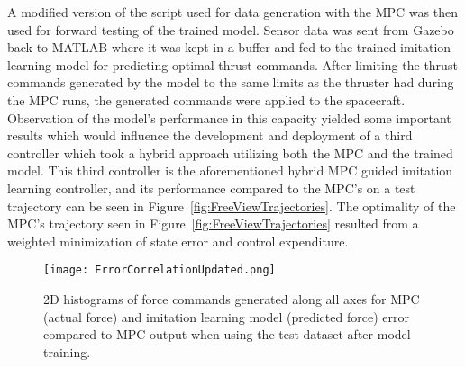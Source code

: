 \documentclass[twocolumn,letterpaper]{IEEEAerospaceCLS}
\begin{document}
A modified version of the script used for data generation with the MPC was then used for forward testing of the trained model. Sensor data was sent from Gazebo back to MATLAB where it was kept in a buffer and fed to the trained imitation learning model for predicting optimal thrust commands. After limiting the thrust commands generated by the model to the same limits as the thruster had during the MPC runs, the generated commands were applied to the spacecraft. Observation of the model's performance in this capacity yielded some important results which would influence the development and deployment of a third controller which took a hybrid approach utilizing both the MPC and the trained model\cite{Sinha2023-st,Hobbs2021-kh}. This third controller is the aforementioned hybrid MPC guided imitation learning controller, and its performance compared to the MPC's on a test trajectory can be seen in Figure~\ref{fig:FreeViewTrajectories}. The optimality of the MPC's trajectory seen in Figure~\ref{fig:FreeViewTrajectories} resulted from a weighted minimization of state error and control expenditure.

\begin{figure*}
\centering
\texttt{[image: ErrorCorrelationUpdated.png]}
\caption{2D histograms of force commands generated along all axes for MPC (actual force) and imitation learning model (predicted force) error compared to MPC output when using the test dataset after model training.}
\label{fig:FullFinalHist}
\end{figure*}
\end{document}
